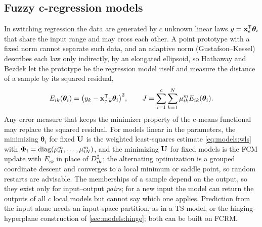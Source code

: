 \subsection{Fuzzy c-regression models}\label{sec:models:fcrm}

In switching regression the data are generated by $c$ unknown linear laws $y=\mathbf{x}_e^{\mathsf{T}}\boldsymbol\theta_i$ that share the input range and may cross each other. A point prototype with a fixed norm cannot separate such data, and an adaptive norm (Gustafson--Kessel) describes each law only indirectly, by an elongated ellipsoid, so Hathaway and Bezdek \cite{hathaway:1993:fcrm} let the prototype be the regression model itself and measure the distance of a sample by its squared residual,
\begin{equation}
  E_{ik}(\boldsymbol\theta_i)=\big(y_k-\mathbf{x}_{e,k}^{\mathsf{T}}\boldsymbol\theta_i\big)^2,\qquad
  J=\sum_{i=1}^{c}\sum_{k=1}^{N}\mu_{ik}^m E_{ik}(\boldsymbol\theta_i).
  \label{eq:models:fcrmJ}
\end{equation}
Any error measure that keeps the minimizer property of the c-means functional may replace the squared residual. For models linear in the parameters, the minimizing $\boldsymbol\theta_i$ for fixed $\mathbf{U}$ is the weighted least-squares estimate \eqref{eq:models:wls} with $\boldsymbol\Phi_i=\operatorname{diag}(\mu^m_{i1},\dots,\mu^m_{iN})$, and the minimizing $\mathbf{U}$ for fixed models is the FCM update with $E_{ik}$ in place of $D^2_{ik}$; the alternating optimization is a grouped coordinate descent and converges to a local minimum or saddle point, so random restarts are advisable. The memberships of a sample depend on the output, so they exist only for input--output \emph{pairs}; for a new input the model can return the outputs of all $c$ local models but cannot say which one applies. Prediction from the input alone needs an input-space partition, as in a TS model, or the hinging-hyperplane construction of \cref{sec:models:hinge}; both can be built on FCRM.

